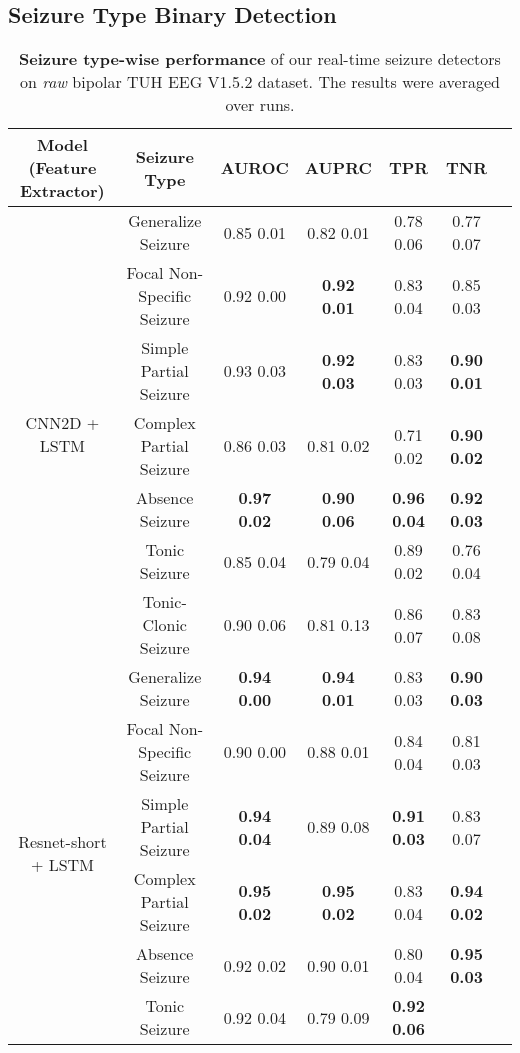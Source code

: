 \documentclass[pmlr,twocolumn,10pt]{jmlr}
\begin{document}
\subsection{Seizure Type Binary Detection}
\begin{table*}[ht!]
	\small
	\centering
	\caption{\textbf{Seizure type-wise performance} of our real-time seizure detectors on \textit{raw} bipolar TUH EEG V1.5.2 dataset. The results were averaged over  runs.}
	\label{seizuretype}
	\begin{tabular}{c|c|ccccc}
		\toprule
		Model (Feature Extractor) &Seizure Type & AUROC & AUPRC & TPR & TNR\\
		\midrule
		\multirow{7}{*}{CNN2D + LSTM}
		&Generalize Seizure 
		& 0.85  0.01 
		& 0.82  0.01 
		& 0.78  0.06 
		& 0.77  0.07 
		\\
		&Focal Non-Specific Seizure 
		& 0.92  0.00 
		& \textbf{0.92  0.01 }
		& 0.83  0.04 
		& 0.85  0.03 \\
		&Simple Partial Seizure 
		& 0.93  0.03 
		& \textbf{0.92  0.03 }
		& 0.83  0.03 
		& \textbf{0.90  0.01 }
		\\
		&Complex Partial Seizure 
		& 0.86  0.03 
		& 0.81  0.02 
		& 0.71  0.02 
		& \textbf{0.90  0.02 }
		\\
		(Raw) &Absence Seizure 
		& \textbf{0.97  0.02 }
		& \textbf{0.90  0.06 }
		& \textbf{0.96  0.04 }
		& \textbf{0.92  0.03 }
		\\
		&Tonic Seizure 
		& 0.85  0.04 
		& 0.79  0.04
		& 0.89  0.02 
		& 0.76  0.04 
		\\
		&Tonic-Clonic Seizure 
		& 0.90  0.06 
		& 0.81  0.13 
		& 0.86  0.07 
		& 0.83  0.08 
		\\
		\midrule
		\multirow{7}{*}{Resnet-short + LSTM }
		&Generalize Seizure 
		& \textbf{0.94  0.00} 
		& \textbf{0.94  0.01} 
		& 0.83  0.03 
		& \textbf{0.90  0.03 }
		\\
		&Focal Non-Specific Seizure 
		& 0.90  0.00 
		& 0.88  0.01 
		& 0.84  0.04 
		& 0.81  0.03 
		\\
		&Simple Partial Seizure 
		&\textbf{0.94  0.04 }
		& 0.89  0.08 
		& \textbf{0.91  0.03 }
		& 0.83  0.07 
		\\
		&Complex Partial Seizure 
		& \textbf{0.95  0.02 }
		& \textbf{0.95  0.02 }
		& 0.83  0.04 
		& \textbf{0.94  0.02 }
		\\
		(Raw)
		&Absence Seizure 
		& 0.92  0.02 
		& 0.90  0.01 
		& 0.80  0.04 
		& \textbf{0.95  0.03 }
		\\
		&Tonic Seizure 
		& 0.92  0.04 
		& 0.79  0.09
		& \textbf{0.92  0.06 }

\end{tabular}
\end{table*}
\end{document}
